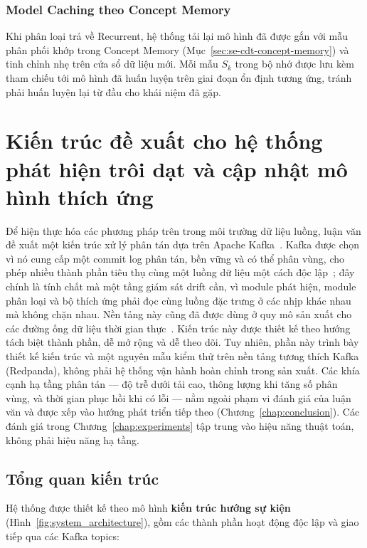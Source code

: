 \subsubsection{Model Caching theo Concept Memory}
Khi phân loại trả về Recurrent, hệ thống tải lại mô hình đã được gắn với mẫu phân phối khớp trong Concept Memory (Mục~\ref{sec:se-cdt-concept-memory}) và tinh chỉnh nhẹ trên cửa sổ dữ liệu mới. Mỗi mẫu $S_k$ trong bộ nhớ được lưu kèm tham chiếu tới mô hình đã huấn luyện trên giai đoạn ổn định tương ứng, tránh phải huấn luyện lại từ đầu cho khái niệm đã gặp.

\section{Kiến trúc đề xuất cho hệ thống phát hiện trôi dạt và cập nhật mô hình thích ứng}
\label{sec:system-architecture}

Để hiện thực hóa các phương pháp trên trong môi trường dữ liệu luồng, luận văn đề xuất một kiến trúc xử lý phân tán dựa trên Apache Kafka~\cite{kreps2011kafka, kafka2024documentation}. Kafka được chọn vì nó cung cấp một commit log phân tán, bền vững và có thể phân vùng, cho phép nhiều thành phần tiêu thụ cùng một luồng dữ liệu một cách độc lập~\cite{wang2015building, kleppmann2015kafka}; đây chính là tính chất mà một tầng giám sát drift cần, vì module phát hiện, module phân loại và bộ thích ứng phải đọc cùng luồng đặc trưng ở các nhịp khác nhau mà không chặn nhau. Nền tảng này cũng đã được dùng ở quy mô sản xuất cho các đường ống dữ liệu thời gian thực~\cite{goodhope2012building, hiraman2018apache}. Kiến trúc này được thiết kế theo hướng tách biệt thành phần, dễ mở rộng và dễ theo dõi. Tuy nhiên, phần này trình bày thiết kế kiến trúc và một nguyên mẫu kiểm thử trên nền tảng tương thích Kafka (Redpanda), không phải hệ thống vận hành hoàn chỉnh trong sản xuất. Các khía cạnh hạ tầng phân tán --- độ trễ dưới tải cao, thông lượng khi tăng số phân vùng, và thời gian phục hồi khi có lỗi --- nằm ngoài phạm vi đánh giá của luận văn và được xếp vào hướng phát triển tiếp theo (Chương~\ref{chap:conclusion}).
Các đánh giá trong Chương~\ref{chap:experiments} tập trung vào hiệu năng thuật toán, không phải hiệu năng hạ tầng.

\subsection{Tổng quan kiến trúc}

Hệ thống được thiết kế theo mô hình \textbf{kiến trúc hướng sự kiện} (Hình~\ref{fig:system_architecture}), gồm các thành phần hoạt động độc lập và giao tiếp qua các Kafka topics:

